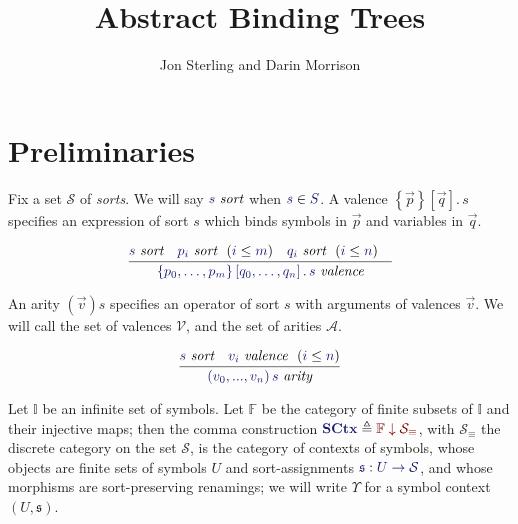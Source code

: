 \documentclass[11pt]{article}
\theoremstyle{definition}
\theoremstyle{remark}
\numberwithin{equation}{section}
\def\IModeColorName{MidnightBlue}
\def\OModeColorName{Maroon}
\newcommand\IMode[1]{{\color{\IModeColorName}{#1}}}
\newcommand\OMode[1]{{\color{\OModeColorName}{#1}}}
\newcommand\HypJ[2]{#1\ \ (#2)}
\newcommand\Member[2]{\IMode{#1}\in\IMode{#2}}
\newcommand\Of[2]{\IMode{#1} : \IMode{#2}}
\newcommand\MkValence[3]{\left\{#1\right\}\left[#2\right].\, #3}
\newcommand\MkArity[2]{\left(#1\right) #2}
\newcommand\IsArity[1]{\IMode{#1}\ \textit{arity}}
\newcommand\IsValence[1]{\IMode{#1}\ \textit{valence}}
\newcommand\IsSort[1]{\IMode{#1}\ \textit{sort}}
\newcommand\Leq[2]{\IMode{#1}\leq\IMode{#2}}
\newcommand\Symbols{\mathbb{I}}
\newcommand\Finsets{\mathbb{F}}
\newcommand\Sorts{\mathcal{S}}
\newcommand\Valences{\mathcal{V}}
\newcommand\Arities{\mathcal{A}}
\newcommand\Discrete[1]{#1_{\equiv}}
\newcommand\SCtx{\mathbf{SCtx}}
\newcommand\Comma[2]{#1 \downarrow #2}
\newcommand\Define[2]{\IMode{#1}\triangleq\OMode{#2}}
\begin{document}
\title{Abstract Binding Trees}
\date{}
\author{Jon Sterling and Darin Morrison}
\maketitle

\section{Preliminaries}

Fix a set $\Sorts$ of \emph{sorts}. We will say $\IsSort{s}$ when
$\Member{s}{S}$. A valence $\MkValence{\vec{p}}{\vec{q}}{s}$ specifies an
expression of sort $s$ which binds symbols in $\vec{p}$ and variables in
$\vec{q}$.

\[
  \infer{
    \IsValence{\MkValence{p_0,\dots,p_m}{q_0,\dots,q_n}{s}}
  }{
    \IsSort{s} &
    \HypJ{\IsSort{p_i}}{\Leq{i}{m}} &
    \HypJ{\IsSort{q_i}}{\Leq{i}{n}} &
  }
\]

An arity $\MkArity{\vec{v}}{s}$ specifies an operator of sort $s$ with
arguments of valences $\vec{v}$. We will call the set of valences $\Valences$,
and the set of arities $\Arities$.

\[
  \infer{
    \IsArity{\MkArity{v_0,...,v_n}{s}}
  }{
    \IsSort{s} &
    \HypJ{\IsValence{v_i}}{\Leq{i}{n}}
  }
\]


Let $\Symbols$ be an infinite set of symbols. Let $\Finsets$ be the category of
finite subsets of $\Symbols$ and their injective maps; then the comma
construction $\Define{\SCtx}{\Comma{\Finsets}{\Discrete{\Sorts}}}$, with
$\Discrete{\Sorts}$ the discrete category on the set $\mathcal{S}$, is the
category of contexts of symbols, whose objects are finite sets of symbols $U$
and sort-assignments $\Of{\mathfrak{s}}{U\to\Sorts}$, and whose morphisms are
sort-preserving renamings; we will write $\Upsilon$ for a symbol context
$(U,\mathfrak{s})$.
\end{document}
